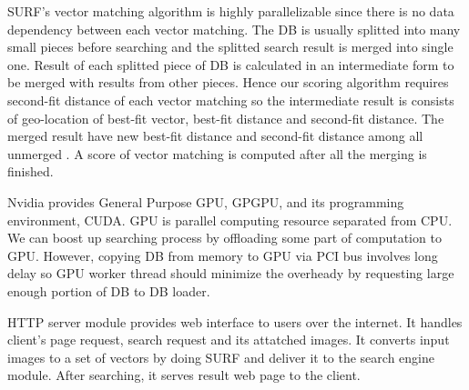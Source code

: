 %

SURF's vector matching algorithm is highly parallelizable since there is no data dependency between each vector matching.
The DB is usually splitted into many small pieces before searching and the splitted search result is merged into single one.
Result of each splitted piece of DB is calculated in an intermediate form to be merged with results from other pieces.
Hence our scoring algorithm requires second-fit distance of each vector matching so the intermediate result is consists of geo-location of best-fit vector, best-fit distance and second-fit distance.
The merged result have new best-fit distance and second-fit distance among all unmerged .
A score of vector matching is computed after all the merging is finished.

Nvidia provides General Purpose GPU, GPGPU, and its programming environment, CUDA.
GPU is parallel computing resource separated from CPU.
We can boost up searching process by offloading some part of computation to GPU.
However, copying DB from memory to GPU via PCI bus involves long delay so GPU worker thread should minimize the overheady by requesting large enough portion of DB to DB loader.

HTTP server module provides web interface to users over the internet.
It handles client's page request, search request and its attatched images.
It converts input images to a set of vectors by doing SURF and deliver it to the search engine module.
After searching, it serves result web page to the client.

